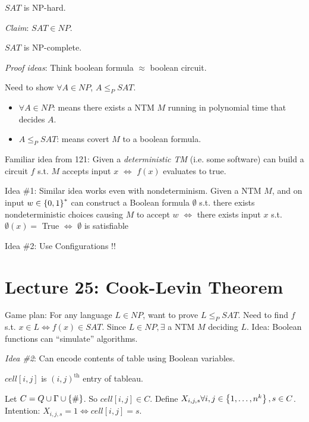 \begin{theorem}
     $SAT$ is NP-hard.
\end{theorem}

\emph{Claim}: $SAT \in NP$.

\begin{corollary}
    $SAT$ is NP-complete.
\end{corollary}

\emph{Proof ideas}: Think boolean formula $\approx$ boolean circuit.

Need to show $\forall A \in NP$, $A \leq_{P} SAT$.

\begin{itemize}
    \item $\forall A \in NP$: means there exists a NTM $M$ running in polynomial time that decides $A$.
    \item $A \leq_{P} SAT$: means covert $M$ to a boolean formula.
\end{itemize}

Familiar idea from 121: Given a \emph{deterministic TM} (i.e. some software) can build a circuit $f$ s.t. $M$ accepts input $x$ $\Leftrightarrow$ $f(x)$ evaluates to true.

Idea \#1: Similar idea works even with nondeterminism. Given a NTM $M$, and on input $w \in \left \{ 0, 1 \right \}^*$ can construct a Boolean formula $\emptyset$ s.t. there exists nondeterministic choices causing $M$ to accept $w$ $\Leftrightarrow$ there exists input $x$ s.t. $\emptyset(x) =$ True $\Leftrightarrow$ $\emptyset$ is satisfiable

Idea \#2: Use Configurations !!


\section*{Lecture 25: Cook-Levin Theorem}

Game plan: For any language $L \in NP$, want to prove $L \leq_{P} SAT$. Need to find $f$ s.t. $x \in L \Leftrightarrow f(x) \in SAT$. Since $L \in NP, \exists$ a NTM $M$ deciding $L$. Idea: Boolean functions can ``simulate'' algorithms.

\emph{Idea \#2}: Can encode contents of table using Boolean variables.

$cell[i, j]$ is $(i, j)^{\text{th}}$ entry of tableau.

Let $C = Q \cup \Gamma \cup \left \{ \# \right \}$. So $cell[i, j] \in C$. Define $X_{i, j, s} \forall i, j \in \left \{ 1, \ldots, n^k \right \}, s \in C$. Intention: $X_{i, j, s} = 1 \Leftrightarrow cell[i, j] = s$.

